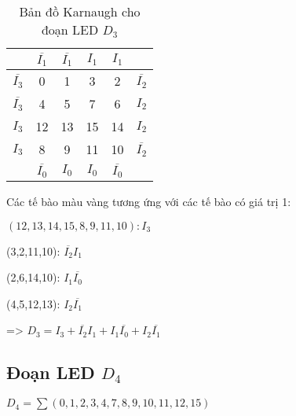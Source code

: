 \begin{table}[H]
	\centering
	\begin{tabular}{|c|c|c|c|c|c|}
		\hline
		                   & \(\overline{I_1}\)   & \(\overline{I_1}\)   & \(I_1\)              & \(I_1\)              &                    \\
		\hline
		\(\overline{I_3}\) & 0                    & 1                    & \cellcolor{yellow}3  & \cellcolor{yellow}2  & \(\overline{I_2}\) \\
		\hline
		\(\overline{I_3}\) & \cellcolor{yellow}4  & \cellcolor{yellow}5  & 7                    & \cellcolor{yellow}6  & \(I_2\)            \\
		\hline
		\(I_3\)            & \cellcolor{yellow}12 & \cellcolor{yellow}13 & \cellcolor{yellow}15 & \cellcolor{yellow}14 & \(I_2\)            \\
		\hline
		\(I_3\)            & \cellcolor{yellow} 8 & \cellcolor{yellow}9  & \cellcolor{yellow}11 & \cellcolor{yellow}10 & \(\overline{I_2}\) \\
		\hline
		                   & \(\overline{I_0}\)   & \(I_0\)              & \(I_0\)              & \(\overline{I_0}\)   &                    \\
		\hline
	\end{tabular}
	\caption*{Bản đồ Karnaugh cho đoạn LED \(D_3\)}
\end{table}

Các tế bào màu vàng tương ứng với các tế bào có giá trị 1:

\((12,13,14,15,8,9,11,10): I_3\)

(3,2,11,10): \(\overline{I_2} I_1\)

(2,6,14,10): \(I_1 \overline{I_0}\)

(4,5,12,13): \(I_2 \overline{I_1}\)

=> \(D_3 = I_3 + \overline{I_2} I_1 + I_1 \overline{I_0} + I_2 \overline{I_1}\)

\subsection{Đoạn LED \texorpdfstring{$D_4$}{D4}}

\(D_4 = \sum(0,1,2,3,4,7,8,9,10,11,12,15)\)

